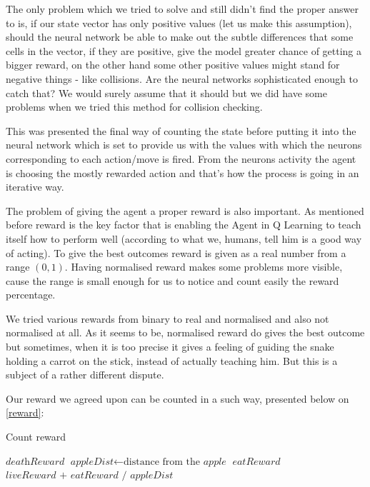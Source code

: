 \documentclass[]{article}
\begin{document}
\newpage

\par The only problem which we tried to solve and still didn't find the proper answer to is, if our state vector has only positive values (let us make this assumption), should the neural network be able to make out the subtle differences that some cells in the vector, if they are positive, give the model greater chance of getting a bigger reward, on the other hand some other positive values might stand for negative things - like collisions. Are the neural networks sophisticated enough to catch that? We would surely assume that it should but we did have some problems when we tried this method for collision checking.

\par This was presented the final way of counting the state before putting it into the neural network which is set to provide us with the values with which the neurons corresponding to each action/move is fired. From the neurons activity the agent is choosing the mostly rewarded action and that's how the process is going in an iterative way. 

\par The problem of giving the agent a proper reward is also important. As mentioned before reward is the key factor that is enabling the Agent in Q Learning to teach itself how to perform well (according to what we, humans, tell him is a good way of acting). To give the best outcomes reward is given as a real number from a range \begin{math} (0,1) \end{math}. Having normalised reward makes some problems more visible, cause the range is small enough for us to notice and count easily the reward percentage. 

\par We tried various rewards from binary to real and normalised and also not normalised at all. As it seems to be, normalised reward do gives the best outcome but sometimes, when it is too precise it gives a feeling of guiding the snake holding a carrot on the stick, instead of actually teaching him. But this is a subject of a rather different dispute. 

\par Our reward we agreed upon can be counted in a such way, presented below on \ref{reward}:

\begin{algorithm}	
	\caption{Count reward}\label{reward}	
	\begin{algorithmic}[1]
		\Return $\textit{deathReward}$
		\Else
			\State $\textit{appleDist} \gets \text{distance from the }\textit{apple}$
			\Return $\textit{eatReward}$
			\Else
			\Return $\textit{liveReward} \text{ + } \textit{eatReward / appleDist}$
			\EndIf
		\EndIf
		\EndProcedure
	\end{algorithmic}
\end{algorithm}
\end{document}

